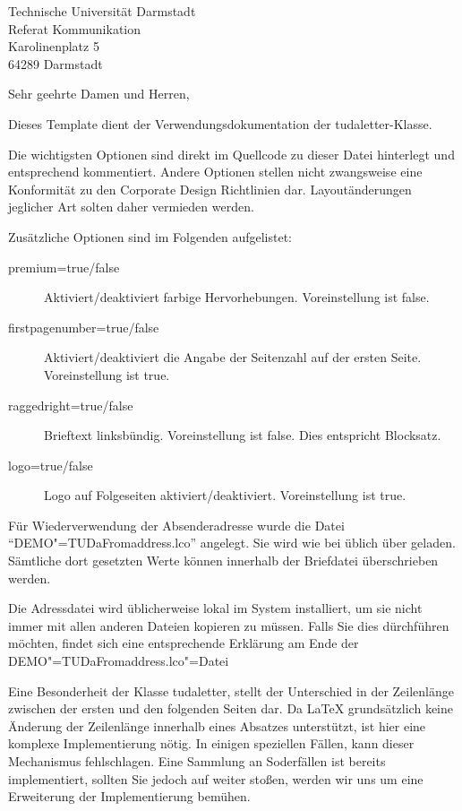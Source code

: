 \documentclass[
	ngerman,
	accentcolor=9c,%
	premium=true,%
]{tudaletter}
\begin{document}
\begin{letter}{%
    Technische Universität Darmstadt\\%
    Referat Kommunikation\\%
    Karolinenplatz 5\\%
    64289 Darmstadt}


\opening{Sehr geehrte Damen und Herren,}
Dieses Template dient der Verwendungsdokumentation der tudaletter-Klasse.

Die wichtigsten Optionen sind direkt im Quellcode zu dieser Datei hinterlegt und entsprechend kommentiert. Andere Optionen stellen nicht zwangsweise eine Konformität zu den Corporate Design Richtlinien dar. Layoutänderungen jeglicher Art solten daher vermieden werden.

Zusätzliche Optionen sind im Folgenden aufgelistet:\\
\parbox{\linewidth}{
\begin{description}
	\item[premium=true/false] Aktiviert/deaktiviert farbige Hervorhebungen. Voreinstellung ist false.
	\item[firstpagenumber=true/false] Aktiviert/deaktiviert die Angabe der Seitenzahl auf der ersten Seite. Voreinstellung ist true.
	\item[raggedright=true/false] Brieftext linksbündig. Voreinstellung ist false. Dies entspricht Blocksatz.
	\item[logo=true/false] Logo auf Folgeseiten aktiviert/deaktiviert. Voreinstellung ist true.
\end{description}
}

Für Wiederverwendung der Absenderadresse wurde die Datei \enquote{DEMO"=TUDaFromaddress.lco} angelegt. Sie wird wie bei \KOMAScript{} üblich über
geladen. Sämtliche dort gesetzten Werte können innerhalb der Briefdatei überschrieben werden.

Die Adressdatei wird üblicherweise lokal im System installiert, um sie nicht immer mit allen anderen Dateien kopieren zu müssen. Falls Sie dies dürchführen möchten, findet sich eine entsprechende Erklärung am Ende der DEMO"=TUDaFromaddress.lco"=Datei

Eine Besonderheit der Klasse tudaletter, stellt der Unterschied in der Zeilenlänge zwischen der ersten und den folgenden Seiten dar. Da \LaTeX{} grundsätzlich keine Änderung der Zeilenlänge innerhalb eines Absatzes unterstützt, ist hier eine komplexe Implementierung nötig. In einigen speziellen Fällen, kann dieser Mechanismus fehlschlagen. Eine Sammlung an Soderfällen ist bereits implementiert, sollten Sie jedoch auf weiter stoßen, werden wir uns um eine Erweiterung der Implementierung bemühen.


\end{letter}
\end{document}

